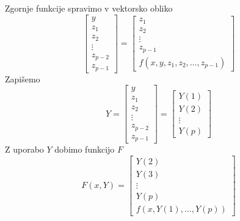 \documentclass[a4paper,12pt]{article}
\theoremstyle{definition}
\theoremstyle{remark}
\begin{document}
Zgornje funkcije spravimo v vektorsko obliko
\begin{equation*}
    \begin{bmatrix}
        y \\
        z_1 \\
        z_2 \\
        \vdots \\
        z_{p-2} \\
        z_{p-1}
    \end{bmatrix}
    =
    \begin{bmatrix}
        z_1 \\
        z_2 \\
        \vdots \\
        z_{p-1} \\
        f(x, y, z_1, z_2, \dots, z_{p-1})
    \end{bmatrix}
\end{equation*}
Zapišemo
\begin{equation*}
    Y = \begin{bmatrix}
        y \\
        z_1 \\
        z_2 \\
        \vdots \\
        z_{p-2} \\
        z_{p-1}
    \end{bmatrix}
    =
    \begin{bmatrix}
        Y(1) \\
        Y(2) \\
        \vdots \\
        Y(p)
    \end{bmatrix}
\end{equation*}
Z uporabo $Y$ dobimo funkcijo $F$
\begin{equation*}
    F(x, Y) = \begin{bmatrix}
        Y(2) \\
        Y(3) \\
        \vdots \\
        Y(p) \\
        f(x, Y(1), \dots, Y(p))
    \end{bmatrix}
\end{equation*}
\end{document}
